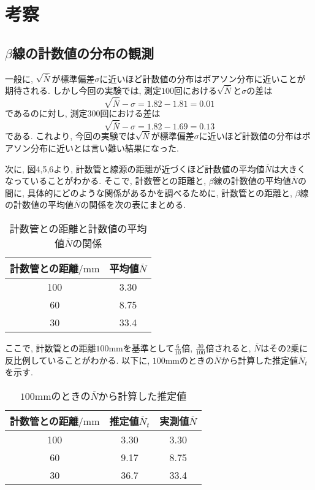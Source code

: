 \documentclass{jarticle}
\begin{document}
\section{考察}


\subsection{$\beta$線の計数値の分布の観測}

一般に, $\sqrt{\overline{N}}$が標準偏差$\sigma$に近いほど計数値の分布はポアソン分布に近いことが期待される.
しかし今回の実験では, 測定$100$回における$\sqrt{\overline{N}}$と$\sigma$の差は
\begin{equation}
  \sqrt{\overline{N}} - \sigma = 1.82 - 1.81 = 0.01
\end{equation}
であるのに対し, 測定$300$回における差は
\begin{equation}
  \sqrt{\overline{N}} - \sigma = 1.82 - 1.69 = 0.13
\end{equation}
である.
これより, 今回の実験では$\sqrt{\overline{N}}$が標準偏差$\sigma$に近いほど計数値の分布はポアソン分布に近いとは言い難い結果になった.

次に, 図4,5,6より, 計数管と線源の距離が近づくほど計数値の平均値$\overline{N}$は大きくなっていることがわかる.
そこで, 計数管との距離と, $\beta$線の計数値の平均値$\overline{N}$の間に, 具体的にどのような関係があるかを調べるために, 計数管との距離と, $\beta$線の計数値の平均値$\overline{N}$の関係を次の表にまとめる.

\begin{table}[H]
  \centering
  \caption{計数管との距離と計数値の平均値$\overline{N}$の関係}
  \label{tb:N-and-distance}
  \begin{tabular}{cc}
    \hline
    計数管との距離$/\mathrm{mm}$ & 平均値$\overline{N}$ \\
    \hline
    100 & 3.30 \\
    60 & 8.75 \\
    30 & 33.4 \\
    \hline
  \end{tabular}
\end{table}

ここで, 計数管との距離$100\mathrm{mm}$を基準として$\frac{6}{10}$倍, $\frac{30}{100}$倍されると, $\overline{N}$はその$2$乗に反比例していることがわかる.
以下に, $100\mathrm{mm}$のときの$\overline{N}$から計算した推定値$\overline{N}_t$を示す.

\begin{table}[H]
  \centering
  \caption{$100\mathrm{mm}$のときの$\overline{N}$から計算した推定値}
  \label{tb:N-and-distance-estimation}
  \begin{tabular}{ccc}
    \hline
    計数管との距離$/\mathrm{mm}$ & 推定値$\overline{N}_t$ & 実測値$\overline{N}$ \\
    \hline
    100 & 3.30 & 3.30 \\
    60 & 9.17 & 8.75 \\
    30 & 36.7 & 33.4 \\
    \hline
  \end{tabular}
\end{table}
\end{document}
